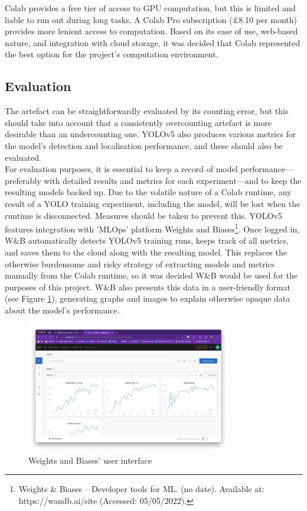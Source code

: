 Colab provides a free tier of access to GPU computation, but this is limited and liable to run out during long tasks. A Colab Pro subscription (£8.10 per month) provides more lenient access to computation. Based on its ease of use, web-based nature, and integration with cloud storage, it was decided that Colab represented the best option for the project's computation environment.

\subsection{Evaluation}
The artefact can be straightforwardly evaluated by its counting error, but this should take into account that a consistently overcounting artefact is more desirable than an undercounting one. YOLOv5 also produces various metrics for the model's detection and localisation performance, and these should also be evaluated.\\

For evaluation purposes, it is essential to keep a record of model performance—preferably with detailed results and metrics for each experiment—and to keep the resulting models backed up. Due to the volatile nature of a Colab runtime, any result of a YOLO training experiment, including the model, will be lost when the runtime is disconnected. Measures should be taken to prevent this. YOLOv5 features integration with 'MLOps' platform Weights and Biases\footnote{Weights & Biases – Developer tools for ML. (no date). Available at: https://wandb.ai/site (Accessed: 05/05/2022).}. Once logged in, W\&B automatically detects YOLOv5 training runs, keeps track of all metrics, and saves them to the cloud along with the resulting model. This replaces the otherwise burdensome and risky strategy of extracting models and metrics manually from the Colab runtime, so it was decided W\&B would be used for the purposes of this project. W\&B also presents this data in a user-friendly format (see Figure \ref{wandb}), generating graphs and images to explain otherwise opaque data about the model's performance.

\begin{figure}[h!]
	\centering
	\includegraphics[width=0.8\textwidth]{images/03Design/wandb.png}
	\caption{Weights and Biases' user interface}
    \label{wandb}
\end{figure}

\label{chap:chapter3}

